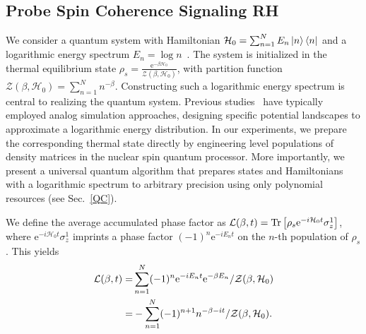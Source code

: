 \documentclass[aps,pra,twocolumn,superscriptaddress,preprintnumbers,amsmath,amssymb]{revtex4-2}
\begin{document}
\subsection{Probe Spin Coherence Signaling RH}\label{model1}
We consider a quantum system with Hamiltonian $\mathcal{H}_0 = \sum_{n=1}^{N} E_n \ket{n}\bra{n}$  and a logarithmic energy
spectrum  $E_n = \log n$~\cite{mack2010riemann}. 
The system is initialized in the thermal equilibrium state 
$\rho_s = \tfrac{\mathrm{e}^{-\beta \mathcal{H}_0}}{\mathcal{Z}(\beta,\mathcal{H}_0)}$, with partition function 
$\mathcal{Z}(\beta,\mathcal{H}_0) = \sum_{n=1}^{N} n^{-\beta}$. 
Constructing such a logarithmic energy spectrum is central to realizing the quantum system. Previous studies~\cite{gleisberg2013factorization,cassettari2023holographic} have typically employed analog simulation approaches, designing specific potential landscapes to approximate a logarithmic energy distribution. In our experiments, we prepare the corresponding thermal state directly by engineering level populations of density matrices in the nuclear spin quantum processor. More importantly, we present a universal quantum algorithm that prepares states and Hamiltonians with a logarithmic spectrum to arbitrary precision using only polynomial resources (see Sec.~\ref{QC}). 

We define the average accumulated phase factor  as ${\cal L}(\beta,t)=\operatorname{Tr}\left[\rho_s \mathrm{e}^{-i \mathcal{H}_0t} \sigma^1_z\right]$, where $\mathrm{e}^{-i \mathcal{H}_0t} \sigma^1_z$ imprints a phase factor $(-1)^n \mathrm{e}^{-iE_nt}$ on the $n$-th population of $\rho_s$. %
This yields
\begin{align}\label{eq:L}
    {\cal L}(\beta,t)=&\sum_{n=1}^{N}(-1)^n\mathrm{e}^{-iE_nt} \mathrm{e}^{-\beta E_n}/{\cal Z}(\beta,\mathcal{H}_0)\notag\\
    =&-\sum_{n=1}^{N}(-1)^{n+1}n^{-\beta-it}/{\cal Z}(\beta,\mathcal{H}_0).
\end{align}
\end{document}
